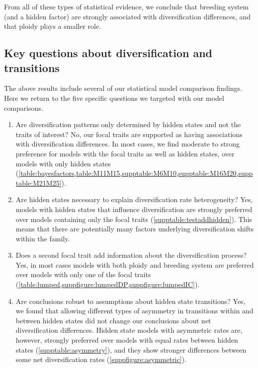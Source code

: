 From all of these types of statistical evidence, we conclude that breeding system (and a hidden factor) are strongly associated with diversification differences, and that ploidy plays a smaller role.

\subsection{Key questions about diversification and transitions}

The above results include several of our statistical model comparison findings.
Here we return to the five specific questions we targeted with our model comparisons.

\begin{enumerate}

    \item Are diversification patterns only determined by hidden states and not the traits of interest?
    No, our focal traits are supported as having associations with diversification differences.
    In most cases, we find moderate to strong preference for models with the focal traits as well as hidden states, over models with only hidden states (\cref{table:bayesfactors,table:M11M15,supptable:M6M10,supptable:M16M20,supptable:M21M25}). %

    \item Are hidden states necessary to explain diversification rate heterogeneity?
    Yes, models with hidden states that influence diversification are strongly preferred over models containing only the focal traits (\cref{supptable:testaddhidden}).
    This means that there are potentially many factors underlying diversification shifts within the family. %

    \item Does a second focal trait add information about the diversification process?
    Yes, in most cases models with both ploidy and breeding system are preferred over models with only one of the focal traits (\cref{table:lumped,suppfigure:lumpedDP,suppfigure:lumpedIC}).

    \item Are conclusions robust to assumptions about hidden state transitions?
    Yes, we found that allowing different types of asymmetry in transitions within and between hidden states did not change our conclusions about net diversification differences.
    Hidden state models with asymmetric rates are, however, strongly preferred over models with equal rates between hidden states (\cref{supptable:asymmetry}), and they show stronger differences between some net diversification rates (\cref{suppfigure:asymmetric}).


\end{enumerate}
